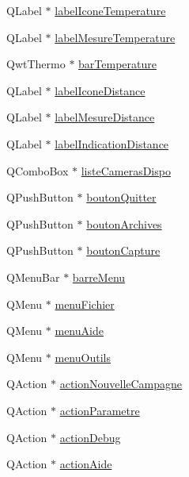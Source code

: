 \begin{DoxyCompactItemize}
Q\+Label $\ast$ \hyperlink{class_i_h_m_rov_a0404f03611d3942e7459ee431f05224c}{label\+Icone\+Temperature}
\item 
Q\+Label $\ast$ \hyperlink{class_i_h_m_rov_ade64349f20dac7adccee4d4fbc04e6e8}{label\+Mesure\+Temperature}
\item 
Qwt\+Thermo $\ast$ \hyperlink{class_i_h_m_rov_aa89397963e5889e2f911bed5112772cb}{bar\+Temperature}
\item 
Q\+Label $\ast$ \hyperlink{class_i_h_m_rov_ae8e7eef50b55104e1490191e3bdcb8d9}{label\+Icone\+Distance}
\item 
Q\+Label $\ast$ \hyperlink{class_i_h_m_rov_a39ff04b1880aa20941716cf7a6e1b8d8}{label\+Mesure\+Distance}
\item 
Q\+Label $\ast$ \hyperlink{class_i_h_m_rov_a14e8fc8b6a1f95e974b550fd54088581}{label\+Indication\+Distance}
\item 
Q\+Combo\+Box $\ast$ \hyperlink{class_i_h_m_rov_a9b9e5631b8d9b6a9801a6faac8cba0f0}{liste\+Cameras\+Dispo}
\item 
Q\+Push\+Button $\ast$ \hyperlink{class_i_h_m_rov_a75b93974e71e86a6a14ea1bc47fa7bd8}{bouton\+Quitter}
\item 
Q\+Push\+Button $\ast$ \hyperlink{class_i_h_m_rov_a1a0c3460e0b9e9c4a1adc54f7f229307}{bouton\+Archives}
\item 
Q\+Push\+Button $\ast$ \hyperlink{class_i_h_m_rov_a149c634582225cff29b6c8555eb7ba85}{bouton\+Capture}
\item 
Q\+Menu\+Bar $\ast$ \hyperlink{class_i_h_m_rov_a169e28bc630468d13c05de321f66ca3c}{barre\+Menu}
\item 
Q\+Menu $\ast$ \hyperlink{class_i_h_m_rov_ad110a9a5cfabc48491ee602075e28066}{menu\+Fichier}
\item 
Q\+Menu $\ast$ \hyperlink{class_i_h_m_rov_a7de335b17ef7b92fdb203cd385ba874f}{menu\+Aide}
\item 
Q\+Menu $\ast$ \hyperlink{class_i_h_m_rov_aab4af4ee5ffb959869ee5f181fe4204e}{menu\+Outils}
\item 
Q\+Action $\ast$ \hyperlink{class_i_h_m_rov_a1ea738e5224f6fa4fc61ac064b5d9a6e}{action\+Nouvelle\+Campagne}
\item 
Q\+Action $\ast$ \hyperlink{class_i_h_m_rov_aa1864bc274cc5662b212a3530255e4ad}{action\+Parametre}
\item 
Q\+Action $\ast$ \hyperlink{class_i_h_m_rov_abf3ebd717e5d59355dd271917962083f}{action\+Debug}
\item 
Q\+Action $\ast$ \hyperlink{class_i_h_m_rov_aecd3c0b54390e60f6e1ba14787c68828}{action\+Aide}
\item 

\end{DoxyCompactItemize}
